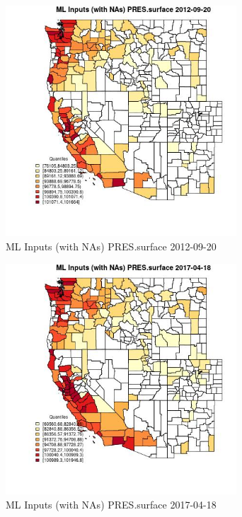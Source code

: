 \begin{figure} 
\centering  
\includegraphics[width=0.77\textwidth]{Code_Outputs/Report_ML_input_PM25_Step4_part_e_de_duplicated_aves_compiled_2019-05-14wNAs_CountyPRESsurfaceMean2012-09-20_2012-09-20.jpg} 
\caption{\label{fig:Report_ML_input_PM25_Step4_part_e_de_duplicated_aves_compiled_2019-05-14wNAsCountyPRESsurfaceMean2012-09-20_2012-09-20}ML Inputs (with NAs) PRES.surface 2012-09-20} 
\end{figure} 
 

\begin{figure} 
\centering  
\includegraphics[width=0.77\textwidth]{Code_Outputs/Report_ML_input_PM25_Step4_part_e_de_duplicated_aves_compiled_2019-05-14wNAs_CountyPRESsurfaceMean2017-04-18_2017-04-18.jpg} 
\caption{\label{fig:Report_ML_input_PM25_Step4_part_e_de_duplicated_aves_compiled_2019-05-14wNAsCountyPRESsurfaceMean2017-04-18_2017-04-18}ML Inputs (with NAs) PRES.surface 2017-04-18} 
\end{figure} 
 

